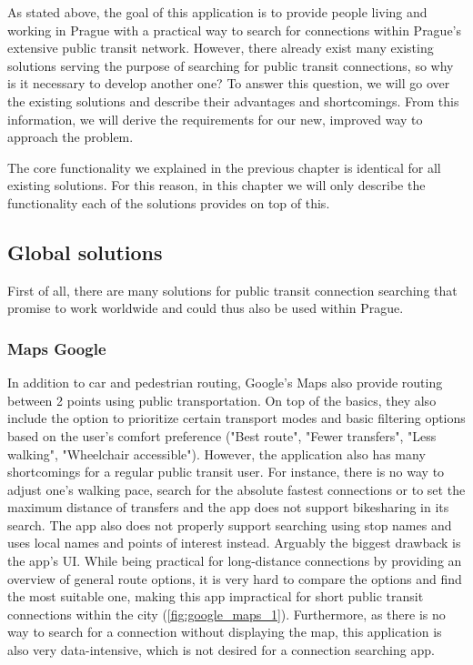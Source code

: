 As stated above, the goal of this application is to provide people living and working in Prague with a practical way to search for connections within Prague's extensive public transit network. However, there already exist many existing solutions serving the purpose of searching for public transit connections, so why is it necessary to develop another one? To answer this question, we will go over the existing solutions and describe their advantages and shortcomings. From this information, we will derive the requirements for our new, improved way to approach the problem.

The core functionality we explained in the previous chapter is identical for all existing solutions. For this reason, in this chapter we will only describe the functionality each of the solutions provides on top of this.

\subsection{Global solutions}

First of all, there are many solutions for public transit connection searching that promise to work worldwide and could thus also be used within Prague.

\subsubsection{Maps Google}
In addition to car and pedestrian routing, Google's Maps also provide routing between 2 points using public transportation. On top of the basics, they also include the option to prioritize certain transport modes and basic filtering options based on the user's comfort preference ("Best route", "Fewer transfers", "Less walking", "Wheelchair accessible"). However, the application also has many shortcomings for a regular public transit user. For instance, there is no way to adjust one's walking pace, search for the absolute fastest connections or to set the maximum distance of transfers and the app does not support bikesharing in its search. The app also does not properly support searching using stop names and uses local names and points of interest instead. Arguably the biggest drawback is the app's UI. While being practical for long-distance connections by providing an overview of general route options, it is very hard to compare the options and find the most suitable one, making this app impractical for short public transit connections within the city (\cref{fig:google_maps_1}). Furthermore, as there is no way to search for a connection without displaying the map, this application is also very data-intensive, which is not desired for a connection searching app.

